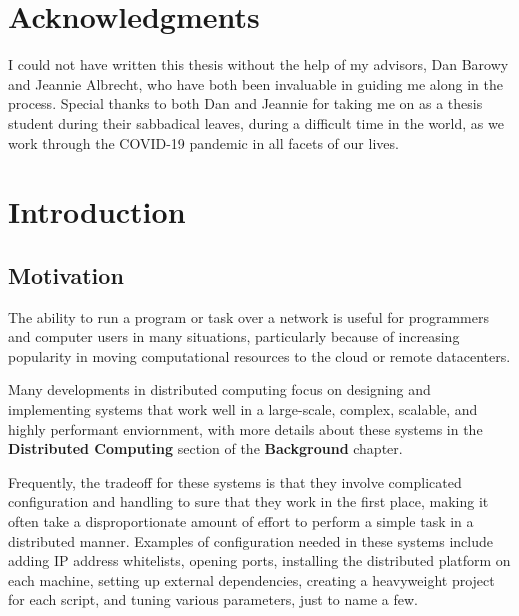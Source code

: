 \documentclass[twoside]{report}
\newcommand{\todoi}[1]{\todo[inline, color=blue!20]{TODO: {#1}}}
\begin{document}
\chapter*{Acknowledgments}

I could not have written this thesis without the help of my advisors, Dan Barowy and Jeannie Albrecht, who have both been invaluable in guiding me along in the process. Special thanks to both Dan and Jeannie for taking me on as a thesis student during their sabbadical leaves, during a difficult time in the world, as we work through the COVID-19 pandemic in all facets of our lives.

\todoi{Expand}


\chapter{Introduction}

\section{Motivation}

The ability to run a program or task over a network is useful for programmers and computer users in many situations, particularly because of increasing popularity in moving computational resources to the cloud or remote datacenters.

Many developments in distributed computing focus on designing and implementing systems that work well in a large-scale, complex, scalable, and highly performant enviornment, with more details about these systems in the \textbf{Distributed Computing} section of the \textbf{Background} chapter.

Frequently, the tradeoff for these systems is that they involve  complicated configuration and handling to sure that they work in the first place, making it often take a disproportionate amount of effort to perform a simple task in a distributed manner.
Examples of configuration needed in these systems include adding IP address whitelists, opening ports, installing the distributed platform on each machine, setting up external dependencies, creating a heavyweight project for each script, and tuning various parameters, just to name a few.
\end{document}
